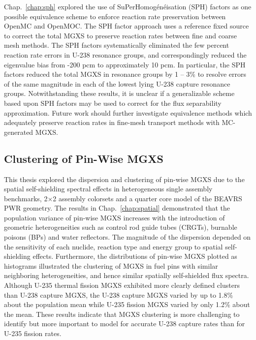 Chap.~\ref{chap:sph} explored the use of SuPerHomog\'{e}n\'{e}isation (SPH) factors as one possible equivalence scheme to enforce reaction rate preservation between OpenMC and OpenMOC. The \ac{SPH} factor approach uses a reference fixed source to correct the total \ac{MGXS} to preserve reaction rates between fine and coarse mesh methods. The \ac{SPH} factors systematically eliminated the few percent reaction rate errors in U-238 resonance groups, and correspondingly reduced the eigenvalue bias from -200 \ac{pcm} to approximately 10 \ac{pcm}. In particular, the \ac{SPH} factors reduced the total \ac{MGXS} in resonance groups by 1 -- 3\% to resolve errors of the same magnitude in each of the lowest lying U-238 capture resonance groups. Notwithstanding these results, it is unclear if a generalizable scheme based upon \ac{SPH} factors may be used to correct for the flux separability approximation. Future work should further investigate equivalence methods which adequately preserve reaction rates in fine-mesh transport methods with \ac{MC}-generated \ac{MGXS}.


\subsection{Clustering of Pin-Wise MGXS}
\label{subsec:chap12-mgxs-clustering}

This thesis explored the dispersion and clustering of pin-wise \ac{MGXS} due to the spatial self-shielding spectral effects in heterogeneous single assembly benchmarks, 2$\times$2 assembly colorsets and a quarter core model of the \ac{BEAVRS} \ac{PWR} geometry. The results in Chap.~\ref{chap:spatial} demonstrated that the population variance of pin-wise \ac{MGXS} increases with the introduction of geometric heterogeneities such as control rod guide tubes (CRGTs), burnable poisons (BPs) and water reflectors. The magnitude of the dispersion depended on the sensitivity of each nuclide, reaction type and energy group to spatial self-shielding effects. Furthermore, the distributions of pin-wise \ac{MGXS} plotted as histograms illustrated the clustering of \ac{MGXS} in fuel pins with similar neighboring heterogeneities, and hence similar spatially self-shielded flux spectra. Although U-235 thermal fission \ac{MGXS} exhibited more clearly defined clusters than U-238 capture \ac{MGXS}, the U-238 capture \ac{MGXS} varied by up to 1.8\% about the population mean while U-235 fission \ac{MGXS} varied by only 1.2\% about the mean. These results indicate that \ac{MGXS} clustering is more challenging to identify but more important to model for accurate U-238 capture rates than for U-235 fission rates.


